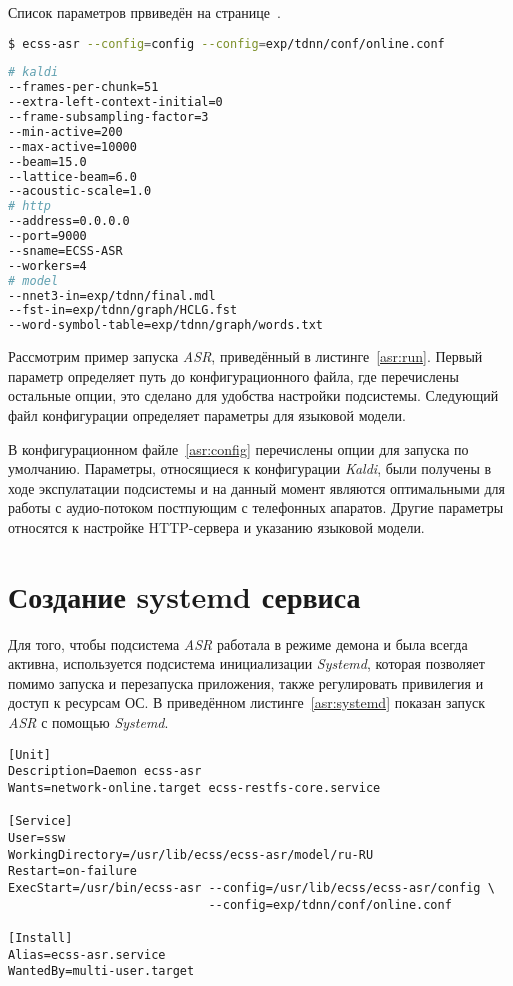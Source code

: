 Список параметров првиведён на странице~\pageref{kaldi:options}.
\begin{lstlisting}[caption={Запуск ASR},label={asr:run},language=bash]
$ ecss-asr --config=config --config=exp/tdnn/conf/online.conf

\end{lstlisting}

\begin{lstlisting}[caption={Содежимое config},label={asr:config},language=bash]
# kaldi
--frames-per-chunk=51
--extra-left-context-initial=0
--frame-subsampling-factor=3
--min-active=200
--max-active=10000
--beam=15.0
--lattice-beam=6.0
--acoustic-scale=1.0
# http
--address=0.0.0.0
--port=9000
--sname=ECSS-ASR
--workers=4
# model
--nnet3-in=exp/tdnn/final.mdl
--fst-in=exp/tdnn/graph/HCLG.fst
--word-symbol-table=exp/tdnn/graph/words.txt

\end{lstlisting}


Рассмотрим пример запуска \textit{ASR}, приведённый в листинге~\ref{asr:run}.
Первый параметр определяет путь до конфигурационного файла, где перечислены
остальные опции, это сделано для удобства настройки подсистемы. Следующий
файл конфигурации определяет параметры для языковой модели.

В конфигурационном файле~\ref{asr:config} перечислены опции для запуска по умолчанию.
Параметры, относящиеся к конфигурации \textit{Kaldi}, были получены в ходе
экспулатации подсистемы и на данный момент являются оптимальными для работы с
аудио-потоком постпующим с телефонных апаратов. Другие параметры относятся к
настройке HTTP-сервера и указанию языковой модели.


\section{Создание systemd сервиса}
Для того, чтобы подсистема \textit{ASR} работала в режиме демона и была всегда
активна, используется подсистема инициализации \textit{Systemd}, которая
позволяет помимо запуска и перезапуска приложения, также регулировать
привилегия и доступ к ресурсам ОС. В приведённом листинге~\ref{asr:systemd}
показан запуск \textit{ASR} с помощью \textit{Systemd}.

\begin{lstlisting}[caption={Содежимое ecss-asr.service},label=asr:systemd]
[Unit]
Description=Daemon ecss-asr
Wants=network-online.target ecss-restfs-core.service

[Service]
User=ssw
WorkingDirectory=/usr/lib/ecss/ecss-asr/model/ru-RU
Restart=on-failure
ExecStart=/usr/bin/ecss-asr --config=/usr/lib/ecss/ecss-asr/config \
                            --config=exp/tdnn/conf/online.conf

[Install]
Alias=ecss-asr.service
WantedBy=multi-user.target

\end{lstlisting}

